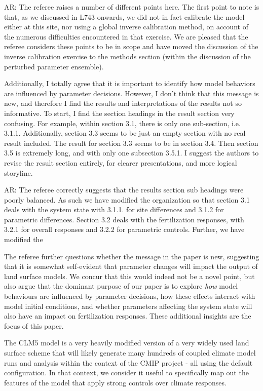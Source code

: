 \documentclass{article}
\begin{document}
\textsf{AR: The referee raises a number of different points here. The first point to note is that, as we discussed in L743 onwards, we did not in fact calibrate the model either at this site, nor using a global inverse calibration method, on account of the numerous difficulties encountered in that exercise.  We are pleased that the referee considers these points to be in scope and have moved the discussion of the inverse calibration exercise to the methods section (within the discussion of the perturbed parameter ensemble).}

Additionally, I totally agree that it is important to identify how model behaviors are influenced by parameter decisions. However, I don't think that this message is new, and therefore I find the results and interpretations of the results not so informative. To start, I find the section headings in the result section very confusing. For example, within section 3.1, there is only one sub-section, i.e. 3.1.1. Additionally, section 3.3 seems to be just an empty section with no real result included. The result for section 3.3 seems to be in section 3.4. Then section 3.5 is extremely long, and with only one subsection 3.5.1. I suggest the authors to revise the result section entirely, for clearer presentations, and more logical storyline. 

\textsf{AR: The referee correctly suggests that the results section sub headings were poorly balanced. As such we have modified the organization so that section 3.1 deals with the system state with 3.1.1. for site differences and 3.1.2 for parametric differences. Section 3.2 deals with the fertilization responses, with 3.2.1 for overall responses and 3.2.2 for parametric controls. Further, we have modified the } 

\textsf{The referee further questions whether the message in the paper is new, suggesting that it is somewhat self-evident that parameter changes will impact the output of land surface models. We concur that this would indeed not be a novel point, but also argue that the dominant purpose of our paper is to explore \emph{how} model behaviours are influenced by parameter decisions, how these effects interact with model initial conditions, and whether parameters affecting the system state will also have an impact on fertilization responses. These additional insights are the focus of this paper. }

\textsf{The CLM5 model is a very heavily modified version of a very widely used land surface scheme that will likely generate many hundreds of coupled climate model runs and analysis within the context of the CMIP project - all using the default configuration. In that context, we consider it useful to specifically map out the features of the model that apply strong controls over climate responses.}
\end{document}
